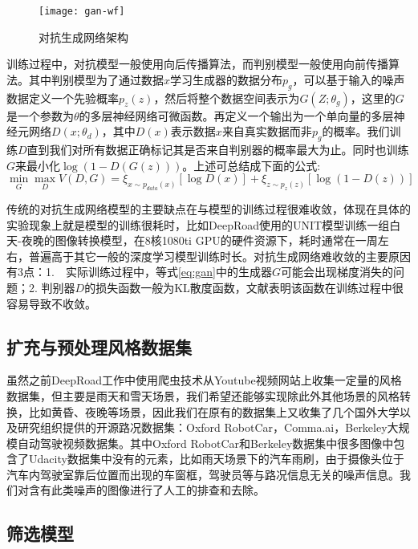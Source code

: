 \begin{figure}[h]
    \centering
    \texttt{[image: gan-wf]}
    \caption{对抗生成网络架构}
    \label{gan-wf}
\end{figure}

训练过程中，对抗模型一般使用向后传播算法，而判别模型一般使用向前传播算法。其中判别模型为了通过数据$x$学习生成器的数据分布$p_g$，可以基于输入的噪声数据定义一个先验概率$p_z(z)$，然后将整个数据空间表示为$G(Z;\theta_g)$，这里的$G$是一个参数为$\theta$的多层神经网络可微函数。再定义一个输出为一个单向量的多层神经元网络$D(x;\theta_d)$，其中$D(x)$表示数据$x$来自真实数据而非$p_g$的概率。我们训练$D$直到我们对所有数据正确标记其是否来自判别器的概率最大为止。同时也训练$G$来最小化$\log(1-D(G(z)))$。上述可总结成下面的公式:
\begin{equation}
    \label{eq:gan}
    \min_G\max_DV(D,G)=\xi_{x\sim p_{data}(x)}[\log D(x)]+\xi_{z\sim p_z(z)}[\log(1-D(z))]
\end{equation}

传统的对抗生成网络模型的主要缺点在与模型的训练过程很难收敛，体现在具体的实验现象上就是模型的训练很耗时，比如DeepRoad使用的UNIT模型训练一组白天-夜晚的图像转换模型，在8核1080ti GPU的硬件资源下，耗时通常在一周左右，普遍高于其它一般的深度学习模型训练时长。对抗生成网络难收敛的主要原因有3点：1.　实际训练过程中，等式\eqref{eq:gan}中的生成器$G$可能会出现梯度消失的问题；2. 判别器$D$的损失函数一般为KL散度函数，文献\cite{arj}表明该函数在训练过程中很容易导致不收敛。

\subsection{扩充与预处理风格数据集}

虽然之前DeepRoad工作中使用爬虫技术从Youtube视频网站上收集一定量的风格数据集，但主要是雨天和雪天场景，我们希望还能够实现除此外其他场景的风格转换，比如黄昏、夜晚等场景，因此我们在原有的数据集上又收集了几个国外大学以及研究组织提供的开源路况数据集：Oxford RobotCar\cite{ds:oxford}，Comma.ai\cite{ds:ai}，Berkeley大规模自动驾驶视频数据集\cite{ds:berkeley}。其中Oxford RobotCar和Berkeley数据集中很多图像中包含了Udacity数据集中没有的元素，比如雨天场景下的汽车雨刷，由于摄像头位于汽车内驾驶室靠后位置而出现的车窗框，驾驶员等与路况信息无关的噪声信息。我们对含有此类噪声的图像进行了人工的排查和去除。


\subsection{筛选模型}

